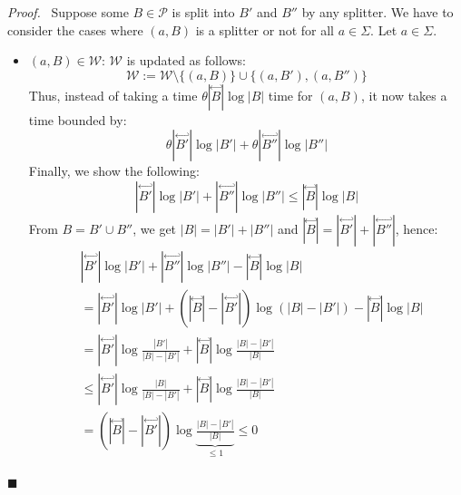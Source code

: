 \documentclass[12pt, a4 paper]{article}
\renewenvironment{proof}[1][Proof]{\begin{mdframed}[backgroundcolor=black!5, topline=false, rightline=false, bottomline=false, linecolor=black!15, linewidth=3pt]{\noindent\textit{#1.}\ }}{\noindent\par\hfill$\blacksquare$\end{mdframed}}
\theoremstyle{definition}
\begin{document}
\begin{proof}
    Suppose some $B \in \mathcal{P}$ is split into $B'$ and $B''$ by any splitter.
    We have to consider the cases where $(a , B)$ is a splitter or not for all $a \in \Sigma$. Let $a \in \Sigma$.
    \begin{itemize}
        \item $(a, B) \in \mathcal{W}$: $\mathcal{W}$ is updated as follows:
        $$ \mathcal{W} := \mathcal{W} \setminus \{(a, B)\} \cup \{(a, B'), (a, B'')\}$$
        Thus, instead of taking a time $\theta | \overset{\hookleftarrow}{B} | \log | B |$ time for $(a, B)$, it now takes a time bounded by:
        $$\theta | \overset{\hookleftarrow}{B'} | \log | B' | + \theta | \overset{\hookleftarrow}{B''} | \log | B'' |$$
        Finally, we show the following:
        \begin{equation*}
            | \overset{\hookleftarrow}{B'} | \log | B' | + | \overset{\hookleftarrow}{B''} | \log | B'' | \leq | \overset{\hookleftarrow}{B} | \log | B |
        \end{equation*}
        From $B = B' \cup B''$, we get $|B| = |B'| + |B''|$ and $| \overset{\hookleftarrow}{B} | = | \overset{\hookleftarrow}{B'} | + | \overset{\hookleftarrow}{B''} |$, hence:
        \begin{align*}
            & |\overset{\hookleftarrow}{B'} | \log | B' | + | \overset{\hookleftarrow}{B''} | \log | B'' | - | \overset{\hookleftarrow}{B} | \log | B | \\
            &= | \overset{\hookleftarrow}{B'} | \log | B' | + (| \overset{\hookleftarrow}{B} | - | \overset{\hookleftarrow}{B'}|) \log \left(|B|-|B'|\right) - | \overset{\hookleftarrow}{B} | \log | B | \\
            &= | \overset{\hookleftarrow}{B'} | \log \frac{|B'|}{|B|-|B'|} + | \overset{\hookleftarrow}{B} | \log \frac{|B|-|B'|}{|B|} \\
            &\leq | \overset{\hookleftarrow}{B'} | \log \frac{|B|}{|B|-|B'|} + | \overset{\hookleftarrow}{B} | \log \frac{|B|-|B'|}{|B|} \\
            &= (| \overset{\hookleftarrow}{B}| - |\overset{\hookleftarrow}{B'} |) \log \underset{\leq 1}{\underbrace{\frac{|B|-|B'|}{|B|}}} \leq 0
        \end{align*}


\end{itemize}
\end{proof}
\end{document}
